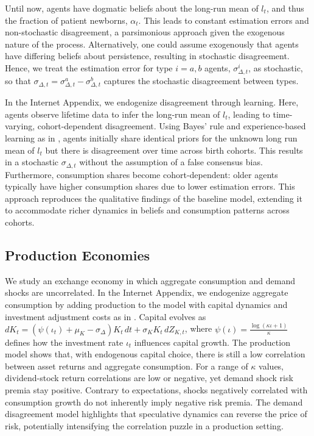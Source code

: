 \documentclass[preprint,11pt,authoryear]{elsarticle}
\theoremstyle{plain}
\begin{document}
Until now, agents have dogmatic beliefs about the long-run mean of \( l_t \), and thus the fraction of patient newborns, \( \alpha_t \). This leads to constant estimation errors and non-stochastic disagreement, a parsimonious approach given the exogenous nature of the process. Alternatively, one could assume exogenously that agents have differing beliefs about persistence, resulting in stochastic disagreement. Hence, we treat the estimation error for type \( i = a, b \) agents, \( \sigma_{\Delta,t}^i \), as stochastic, so that \( \sigma_{\Delta,t} = \sigma_{\Delta,t}^a - \sigma_{\Delta,t}^b \) captures the stochastic disagreement between types.  

In the Internet Appendix, we endogenize disagreement through learning. Here, agents observe lifetime data to infer the long-run mean of \( l_t \), leading to time-varying, cohort-dependent disagreement. Using Bayes' rule and experience-based learning as in \cite{EGH18}, agents initially share identical priors for the unknown long run mean of $l_t$ but there is disagreement over time across birth cohorts. This results in a stochastic \( \sigma_{\Delta,t} \) without the assumption of a false consensus bias. Furthermore, consumption shares become cohort-dependent: older agents typically have higher consumption shares due to lower estimation errors. This approach reproduces the qualitative findings of the baseline model, extending it to accommodate richer dynamics in beliefs and consumption patterns across cohorts.

 

\subsection{Production Economies}\label{sec:Production}



We study an exchange economy in which aggregate consumption and demand shocks are uncorrelated. In the Internet Appendix, we endogenize aggregate consumption by adding production to the model with capital dynamics and investment adjustment costs as in \cite{BrunnermeierSannikov2014}. Capital evolves as \( dK_t = \left(\psi(\iota_t) + \mu_K - \sigma_{\Delta}\right) K_t \, dt + \sigma_K K_t \, dZ_{K,t} \), where \( \psi(\iota) = \frac{\log(\kappa \iota + 1)}{\kappa} \) defines how the investment rate \( \iota_t \) influences capital growth. The production model shows that, with endogenous capital choice, there is still a low correlation between asset returns and aggregate consumption. For a range of \( \kappa \) values, dividend-stock return correlations are low or negative, yet demand shock risk premia stay positive. Contrary to expectations, shocks negatively correlated with consumption growth do not inherently imply negative risk premia. The demand disagreement model highlights that speculative dynamics can reverse the price of risk, potentially intensifying the correlation puzzle in a production setting.
\end{document}
